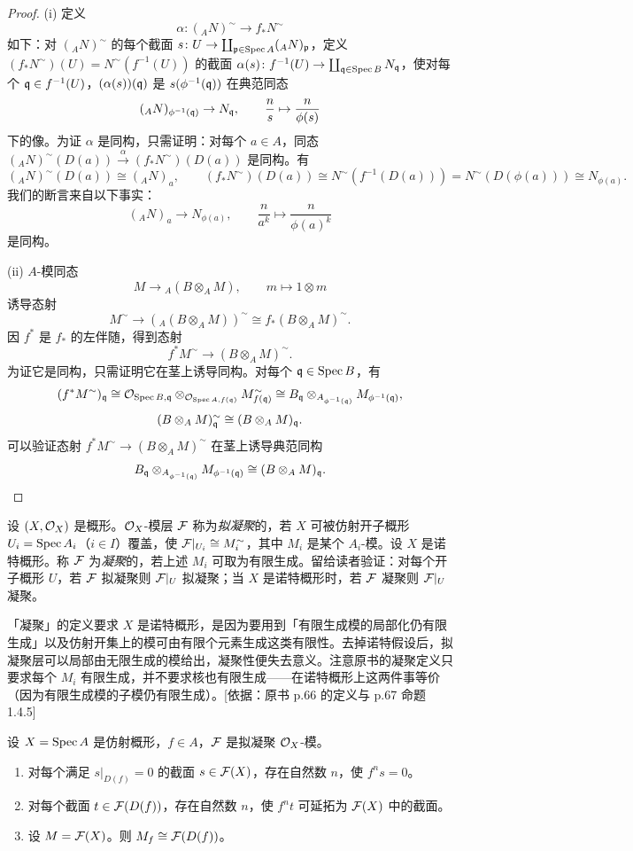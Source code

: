 \begin{proof}
(i) 定义
\[
\alpha\colon({}_A N)^\sim\to f_*N^\sim
\]
如下：对 $({}_A N)^\sim$ 的每个截面 $s\colon U\to\coprod_{\mathfrak{p}\in\operatorname{Spec} A}({}_A N)_{\mathfrak{p}}$，定义 $(f_*N^\sim)(U)=N^\sim(f^{-1}(U))$ 的截面 $\alpha(s)\colon f^{-1}(U)\to\coprod_{\mathfrak{q}\in\operatorname{Spec} B}N_{\mathfrak{q}}$，使对每个 $\mathfrak{q}\in f^{-1}(U)$，$(\alpha(s))(\mathfrak{q})$ 是 $s(\phi^{-1}(\mathfrak{q}))$ 在典范同态
\[
({}_A N)_{\phi^{-1}(\mathfrak{q})}\to N_{\mathfrak{q}},\qquad \frac{n}{s}\mapsto\frac{n}{\phi(s)}
\]
下的像。为证 $\alpha$ 是同构，只需证明：对每个 $a\in A$，同态 $({}_A N)^\sim(D(a))\xrightarrow{\alpha}(f_*N^\sim)(D(a))$ 是同构。有
\[
({}_A N)^\sim(D(a))\cong({}_A N)_a,\qquad
(f_*N^\sim)(D(a))\cong N^\sim(f^{-1}(D(a)))=N^\sim(D(\phi(a)))\cong N_{\phi(a)}.
\]
我们的断言来自以下事实：
\[
({}_A N)_a\to N_{\phi(a)},\qquad \frac{n}{a^k}\mapsto\frac{n}{\phi(a)^k}
\]
是同构。

(ii) $A$-模同态
\[
M\to{}_A(B\otimes_A M),\qquad m\mapsto1\otimes m
\]
诱导态射
\[
M^\sim\to({}_A(B\otimes_A M))^\sim\cong f_*(B\otimes_A M)^\sim.
\]
因 $f^*$ 是 $f_*$ 的左伴随，得到态射
\[
f^*M^\sim\to(B\otimes_A M)^\sim.
\]
为证它是同构，只需证明它在茎上诱导同构。对每个 $\mathfrak{q}\in\operatorname{Spec} B$，有
\[
(f^*M^\sim)_{\mathfrak{q}}\cong\mathcal{O}_{\operatorname{Spec} B,\mathfrak{q}}\otimes_{\mathcal{O}_{\operatorname{Spec} A,f(\mathfrak{q})}}M^\sim_{f(\mathfrak{q})}
\cong B_{\mathfrak{q}}\otimes_{A_{\phi^{-1}(\mathfrak{q})}}M_{\phi^{-1}(\mathfrak{q})},
\]
\[
(B\otimes_A M)^\sim_{\mathfrak{q}}\cong(B\otimes_A M)_{\mathfrak{q}}.
\]
可以验证态射 $f^*M^\sim\to(B\otimes_A M)^\sim$ 在茎上诱导典范同构
\[
B_{\mathfrak{q}}\otimes_{A_{\phi^{-1}(\mathfrak{q})}}M_{\phi^{-1}(\mathfrak{q})}\cong(B\otimes_A M)_{\mathfrak{q}}.
\]
\end{proof}

设 $(X,\mathcal{O}_X)$ 是概形。$\mathcal{O}_X$-模层 $\mathcal{F}$ 称为\emph{拟凝聚}的，若 $X$ 可被仿射开子概形 $U_i=\operatorname{Spec} A_i$（$i\in I$）覆盖，使 $\mathcal{F}|_{U_i}\cong M_i^\sim$，其中 $M_i$ 是某个 $A_i$-模。设 $X$ 是诺特概形。称 $\mathcal{F}$ 为\emph{凝聚}的，若上述 $M_i$ 可取为有限生成。留给读者验证：对每个开子概形 $U$，若 $\mathcal{F}$ 拟凝聚则 $\mathcal{F}|_U$ 拟凝聚；当 $X$ 是诺特概形时，若 $\mathcal{F}$ 凝聚则 $\mathcal{F}|_U$ 凝聚。
\begin{tnote}
「凝聚」的定义要求 $X$ 是诺特概形，是因为要用到「有限生成模的局部化仍有限生成」以及仿射开集上的模可由有限个元素生成这类有限性。去掉诺特假设后，拟凝聚层可以局部由无限生成的模给出，凝聚性便失去意义。注意原书的凝聚定义只要求每个 $M_i$ 有限生成，并不要求核也有限生成——在诺特概形上这两件事等价（因为有限生成模的子模仍有限生成）。[依据：原书 p.66 的定义与 p.67 命题 1.4.5]
\end{tnote}

\begin{lemma}\label{it:1.4.4}
设 $X=\operatorname{Spec} A$ 是仿射概形，$f\in A$，$\mathcal{F}$ 是拟凝聚 $\mathcal{O}_X$-模。
\begin{enumerate}[label=(\roman*),leftmargin=2.8em]
  \item 对每个满足 $s|_{D(f)}=0$ 的截面 $s\in\mathcal{F}(X)$，存在自然数 $n$，使 $f^ns=0$。
  \item 对每个截面 $t\in\mathcal{F}(D(f))$，存在自然数 $n$，使 $f^nt$ 可延拓为 $\mathcal{F}(X)$ 中的截面。
  \item 设 $M=\mathcal{F}(X)$。则 $M_f\cong\mathcal{F}(D(f))$。
\end{enumerate}
\end{lemma}

